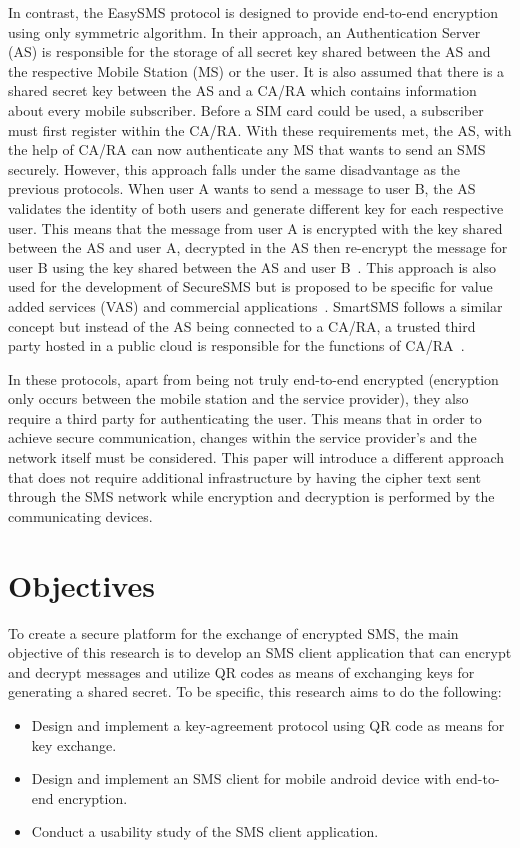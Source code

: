 \documentclass{report}
\begin{document}
In contrast, the EasySMS protocol is designed to provide
end-to-end encryption using only symmetric algorithm. In their approach,
an Authentication Server (AS) is responsible for the storage of all secret key
shared between the AS and the respective Mobile Station (MS) or the user.
It is also assumed that there is a shared secret key between the AS and a
CA/RA which contains information about every mobile subscriber. Before a SIM
card could be used, a subscriber must first register within the CA/RA. With
these requirements met, the AS, with the help of CA/RA can now authenticate
any MS that wants to send an SMS securely. However, this approach falls under
the same disadvantage as the previous protocols. When user A wants to send a message to user B, the AS validates the identity of both users and generate
different key for each respective user. This means that the message from
user A is encrypted with the key shared between the AS and user A, decrypted
in the AS then re-encrypt the message for user B using the key shared between
the AS and user B~\cite{EasySMS14}. This approach is also used for the development of
SecureSMS but is proposed to be specific for value added
services (VAS) and commercial applications~\cite{SecureSMS14}. SmartSMS follows
a similar concept but instead of the AS being connected to a CA/RA, a
trusted third party hosted in a public cloud is responsible for the
functions of CA/RA~\cite{SmartSMS16}.

In these protocols, apart from being not truly end-to-end encrypted (encryption
only occurs between the mobile station and the service provider), they also
require a third party for authenticating the user. This means that in order to
achieve secure communication, changes within the service provider's and the
network itself must be considered. This paper will introduce a
different approach that does not require additional infrastructure by
having the cipher text sent through the SMS network while encryption and
decryption is performed by the communicating devices.

\section{Objectives}
To create a secure platform for the exchange of encrypted SMS, the main
objective of this research is to develop an SMS client application that
can encrypt and decrypt messages and utilize QR codes as means of
exchanging keys for generating a shared secret. To be specific, this research
aims to do the following:
\begin{itemize}
	\item[1.] Design and implement a key-agreement protocol using QR code
		as means for key exchange.
	\item[2.] Design and implement an SMS client for mobile android device  with
		end-to-end encryption.
	\item[3.] Conduct a usability study of the SMS client application.
\end{itemize}
\end{document}
